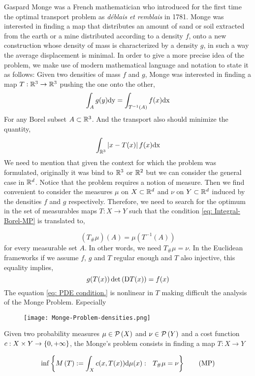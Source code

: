 Gaspard Monge was a French mathematician who introduced for the first time the optimal transport problem as \textit{d\'eblais et remblais} in 1781. Monge was interested in finding a map that distributes an amount of sand or soil extracted from the earth or a mine distributed according to a density $f$, onto a new construction whose density of mass is characterized by a density $g$, in such a way the average displacement is minimal. 
In order to give a more precise idea of the problem, we make use of modern mathematical language and notation to state it as follows: Given two densities of mass $f$ and $g$, Monge was interested in finding a map $T:\mathbb{R}^3\rightarrow\mathbb{R}^3$ pushing the one onto the other,
\begin{equation}
	\int_A g(y) \mathrm{dy} = \int_{T^{-1}(A)} f(x) \mathrm{dx}  \label{eq: Integral-Borel-MP}
\end{equation}
For any Borel subset $A\subset\mathbb{R}^3$. And the transport also should minimize the quantity, 
\begin{equation*}
	\int_{\mathbb{R}^3} \left| x-T(x) \right| f(x)\mathrm{dx}
\end{equation*}
We need to mention that given the context for which the problem was formulated, originally it was bind to $\mathbb{R}^3$ or $\mathbb{R}^2$ but we can consider the general case in $\mathbb{R}^d$. Notice that the problem requires a notion of measure. Then we find convenient to consider the measures $\mu$ on $X \subset \mathbb{R}^d$ and $\nu$ on $Y \subset \mathbb{R}^d$ induced by the densities $f$ and $g$ respectively. Therefore, we need to search for the optimum in the set of measurables maps $T:X \rightarrow Y$ such that the condition \eqref{eq: Integral-Borel-MP} is translated to,

\begin{equation}
	(T_\#\mu)(A)=\mu(T^{-1}(A))
\end{equation}
for every measurable set $A$. In other words, we need $T_\# \mu = \nu$.  In the Euclidean frameworks if we assume $f$, $g$ and $T$ regular enough and $T$ also injective, this equality implies,
\begin{equation}
	g(T(x))\det\left( \mathrm{D} T(x) \right)=f(x) \label{eq: PDE Monge condition.}
\end{equation} 
The equation \eqref{eq: PDE condition.} is nonlinear in $T$ making difficult the analysis of the Monge Problem. Especially 

\begin{figure}[H]
	\centering
	\caption{}
	\texttt{[image: Monge-Problem-densities.png]}
\end{figure}
\begin{problem} Given two probability measures $\mu \in \mathcal{P}\left( X \right)$ and $\nu \in \mathcal{P}\left( Y \right)$ and a cost function $c: X \times Y \rightarrow \left\lbrace 0, +\infty \right\rbrace$, the Monge's problem consists in finding a map $T:X\rightarrow Y$
	
\begin{equation}
\inf\left\lbrace M\left(T\right):=\int_X c(x, T(x)) \mathrm{d} \mu(x): \ \ T_\# \mu=\nu  \right\rbrace\label{eq: Monge's Problem.}\tag{MP}
\end{equation}
\end{problem}

